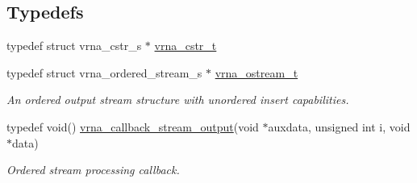 \subsection*{Typedefs}
\begin{DoxyCompactItemize}
\item 
typedef struct vrna\+\_\+cstr\+\_\+s $\ast$ \mbox{\hyperlink{group__buffer__utils_ga445bbbcfca238a956bbc11862892adc8}{vrna\+\_\+cstr\+\_\+t}}
\item 
typedef struct vrna\+\_\+ordered\+\_\+stream\+\_\+s $\ast$ \mbox{\hyperlink{group__buffer__utils_ga8da189552af21ab6e4e88bdcc240870c}{vrna\+\_\+ostream\+\_\+t}}
\begin{DoxyCompactList}\small\item\em An ordered output stream structure with unordered insert capabilities. \end{DoxyCompactList}\item 
typedef void() \mbox{\hyperlink{group__buffer__utils_ga4adb94338a6f0a1a451e03c1bdac0d9d}{vrna\+\_\+callback\+\_\+stream\+\_\+output}}(void $\ast$auxdata, unsigned int i, void $\ast$data)
\begin{DoxyCompactList}\small\item\em Ordered stream processing callback. \end{DoxyCompactList}\end{DoxyCompactItemize}

